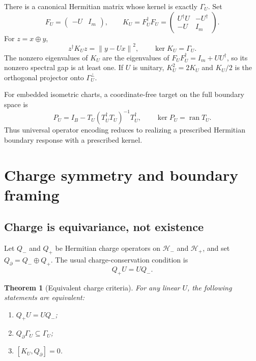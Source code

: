 \documentclass[11pt]{article}
\numberwithin{equation}{section}
\newtheorem{theorem}{Theorem}[section]
\theoremstyle{definition}
\theoremstyle{remark}
\newcommand{\ran}{\operatorname{ran}}
\newcommand{\norm}[1]{\left\lVert #1\right\rVert}
\begin{document}
There is a canonical Hermitian matrix whose kernel is exactly $\Gamma_U$.  Set
\begin{equation}
  F_U=\begin{pmatrix}-U&I_m\end{pmatrix},
  \qquad
  K_U=F_U^\dagger F_U
  =\begin{pmatrix}
    U^\dagger U&-U^\dagger\\
    -U&I_m
  \end{pmatrix}.
  \label{eq:KU}
\end{equation}
For $z=x\oplus y$,
\begin{equation}
  z^\dagger K_Uz=\norm{y-Ux}^2,
  \qquad
  \ker K_U=\Gamma_U.
  \label{eq:KU-energy}
\end{equation}
The nonzero eigenvalues of $K_U$ are the eigenvalues of
$F_UF_U^\dagger=I_m+UU^\dagger$, so its nonzero spectral gap is at least one.
If $U$ is unitary, $K_U^2=2K_U$ and $K_U/2$ is the orthogonal projector onto
$\Gamma_U^\perp$.

For embedded isometric charts, a coordinate-free target on the full boundary
space is
\begin{equation}
  P_U=I_B-T_U(T_U^\dagger T_U)^{-1}T_U^\dagger,
  \qquad
  \ker P_U=\ran T_U.
  \label{eq:embedded-projector}
\end{equation}
Thus universal operator encoding reduces to realizing a prescribed Hermitian
boundary response with a prescribed kernel.

\section{Charge symmetry and boundary framing}

\subsection{Charge is equivariance, not existence}

Let $Q_-$ and $Q_+$ be Hermitian charge operators on $\mathcal H_-$ and
$\mathcal H_+$, and set $Q_\partial=Q_-\oplus Q_+$.  The usual
charge-conservation condition is
\begin{equation}
  Q_+U=UQ_-.
  \label{eq:charge-intertwiner}
\end{equation}

\begin{theorem}[Equivalent charge criteria]
\label{thm:charge}
For any linear $U$, the following statements are equivalent:
\begin{enumerate}[label=(\alph*)]
  \item $Q_+U=UQ_-$;
  \item $Q_\partial\Gamma_U\subseteq\Gamma_U$;
  \item $[K_U,Q_\partial]=0$.
\end{enumerate}
\end{theorem}
\end{document}
